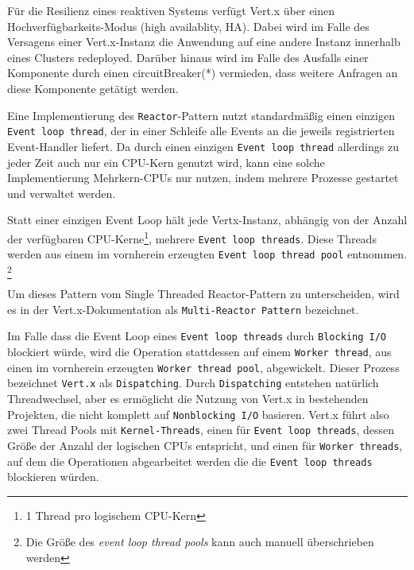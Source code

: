 Für die Resilienz eines reaktiven Systems verfügt Vert.x über einen Hochverfügbarkeits-Modus (high availablity, HA).
Dabei wird im Falle des Versagens einer Vert.x-Instanz die Anwendung auf eine andere Instanz innerhalb eines Clusters redeployed.
Darüber hinaus wird im Falle des Ausfalls einer Komponente durch einen \Gls{circuitBreaker}(*) vermieden, dass weitere Anfragen an diese
Komponente getätigt werden.\newline

Eine Implementierung des \verb|Reactor|-Pattern nutzt standardmäßig einen einzigen \newline\verb|Event loop thread|,
der in einer Schleife alle Events an die jeweils registrierten Event-Handler liefert.
Da durch einen einzigen \verb|Event loop thread| allerdings zu jeder Zeit auch nur ein CPU-Kern genutzt wird, kann
eine solche Implementierung Mehrkern-CPUs nur nutzen, indem mehrere Prozesse gestartet und verwaltet werden.

Statt einer einzigen Event Loop hält jede Vertx-Instanz, abhängig von der Anzahl der verfügbaren CPU-Kerne\footnote{1 Thread pro logischem CPU-Kern},
mehrere \verb|Event loop threads|. Diese Threads werden aus einem im vornherein erzeugten \verb|Event loop thread pool| entnommen.
\footnote{Die Größe des \textit{event loop thread pools} kann auch manuell überschrieben werden}

Um dieses Pattern vom Single Threaded Reactor-Pattern zu unterscheiden, wird es in der Vert.x-Dokumentation als \verb|Multi-Reactor Pattern| bezeichnet.
\parencite{Vert.xDocs}  \newline

Im Falle dass die Event Loop eines \verb|Event loop threads| durch \verb|Blocking I/O| blockiert würde, wird die Operation stattdessen auf einem
\verb|Worker thread|, aus einen im vornherein erzeugten \verb|Worker thread pool|, abgewickelt. Dieser Prozess bezeichnet \verb|Vert.x| als \verb|Dispatching|.
Durch \verb|Dispatching| entstehen natürlich Threadwechsel, aber es ermöglicht die Nutzung von Vert.x in bestehenden Projekten, die nicht komplett
auf \verb|Nonblocking I/O| basieren\parencite[Seite 2]{VertxArticle}.
Vert.x führt also zwei Thread Pools mit \verb|Kernel-Threads|, einen für \verb|Event loop threads|, dessen Größe der Anzahl der logischen CPUs entspricht,
und einen für \verb|Worker threads|, auf dem die Operationen abgearbeitet werden die die \verb|Event loop threads| blockieren würden.
\parencite{Vert.xOptions}

